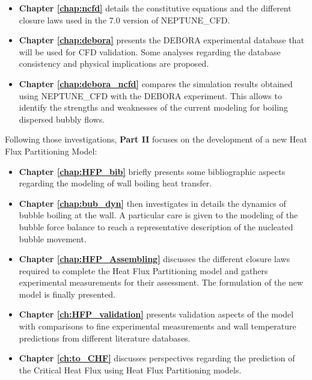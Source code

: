 \begin{itemize}
\item \textbf{Chapter \ref{chap:ncfd}} details the constitutive equations and the different closure laws used in the 7.0 version of NEPTUNE\_CFD. 

\item \textbf{Chapter \ref{chap:debora}} presents the DEBORA experimental database that will be used for CFD validation. Some analyses regarding the database consistency and physical implications are proposed.

\item \textbf{Chapter \ref{chap:debora_ncfd}} compares the simulation results obtained using NEPTUNE\_CFD with the DEBORA experiment. This allows to identify the strengths and weaknesses of the current modeling for boiling dispersed bubbly flows.

\end{itemize}


Following those investigations, \textbf{Part II} focuses on the development of a new Heat Flux Partitioning Model:

\begin{itemize}
\item \textbf{Chapter \ref{chap:HFP_bib}} briefly presents some bibliographic aspects regarding the modeling of wall boiling heat transfer.

\item \textbf{Chapter \ref{chap:bub_dyn}} then investigates in details the dynamics of bubble boiling at the wall. A particular care is given to the modeling of the bubble force balance to reach a representative description of the nucleated bubble movement.

\item \textbf{Chapter \ref{chap:HFP_Assembling}} discusses the different closure laws required to complete the Heat Flux Partitioning model and gathers experimental measurements for their assessment. The formulation of the new model is finally presented.

\item \textbf{Chapter \ref{ch:HFP_validation}} presents validation aspects of the model with comparisons to fine experimental measurements and wall temperature predictions from different literature databases.

\item \textbf{Chapter \ref{ch:to_CHF}} discusses perspectives regarding the prediction of the Critical Heat Flux using Heat Flux Partitioning models.
\end{itemize}

